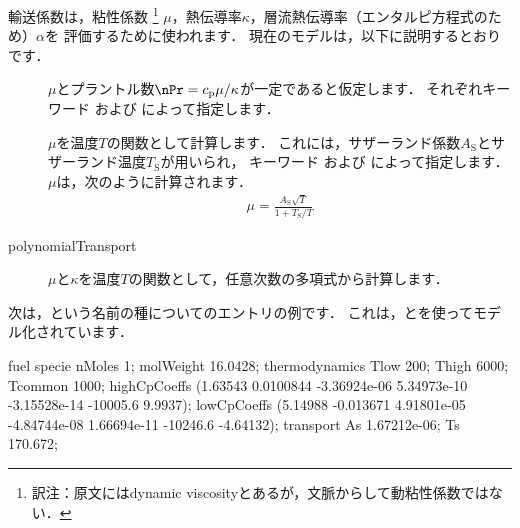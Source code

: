 輸送係数は，粘性係数%
\footnote{訳注：原文にはdynamic viscosityとあるが，文脈からして動粘性係数ではない．}%
$\mu$，熱伝導率$\kappa$，層流熱伝導率（エンタルピ方程式のため）$\alpha$を
評価するために使われます．
現在のモデルは，以下に説明するとおりです．
\begin{description}
 \item[]
            $\mu$とプラントル数$\nPr = c_{\mathrm{p}}\mu/\kappa$が一定であると仮定します．
            それぞれキーワード
%
%
            および
%
%
            によって指定します．
 \item[]
            $\mu$を温度$T$の関数として計算します．
            これには，サザーランド係数$A_{\mathrm{S}}$とサザーランド温度$T_{\mathrm{S}}$が用いられ，
            キーワード
%
%
            および
%
%
            によって指定します．
            $\mu$は，次のように計算されます．
\begin{align}
 \label{eq:7.2}
 \mu = \frac{A_{\mathrm{S}}\sqrt{T}}{1 + T_{\mathrm{S}}/T}
\end{align}
 \item[polynomialTransport]
            $\mu$と$\kappa$を温度$T$の関数として，任意次数の多項式から計算します．
\end{description}
次は，という名前の種についてのエントリの例です．
これは，とを使ってモデル化されています．
%
%
%
%
%
%
%
%
%
%
\begin{OFverbatim}[file]
fuel
{
    specie
    {
        nMoles       1;
        molWeight    16.0428;
    }
    thermodynamics
    {
        Tlow         200;
        Thigh        6000;
        Tcommon      1000;
        highCpCoeffs (1.63543 0.0100844 -3.36924e-06 5.34973e-10
                      -3.15528e-14 -10005.6 9.9937);
        lowCpCoeffs  (5.14988 -0.013671 4.91801e-05 -4.84744e-08
                      1.66694e-11 -10246.6 -4.64132);
    }
    transport
    {
        As           1.67212e-06;
        Ts           170.672;
    }
}
\end{OFverbatim}
